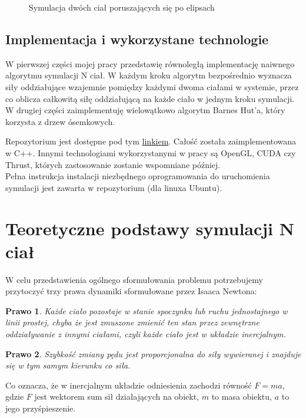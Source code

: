 \documentclass[14pt,twoside,a4paper]{article}
\newtheorem{theorem}{Prawo}
\theoremstyle{definition}
\begin{document}
\begin{figure}
    \centering
    \def\svgwidth{\columnwidth}
    
    \caption{Symulacja dwóch ciał poruszających się po elipsach}
    \label{fig:kulki}
\end{figure}


\subsection{\Large Implementacja i wykorzystane technologie}
W pierwszej części mojej pracy przedstawię równoległą implementację naiwnego algorytmu symulacji N ciał. W każdym kroku algorytm bezpośrednio wyznacza siły oddziałujące wzajemnie pomiędzy każdymi dwoma ciałami w systemie, przez co oblicza całkowitą siłę oddziałującą na każde ciało w jednym kroku symulacji. W drugiej części zaimplementuję wielowątkowo algorytm Barnes Hut'a, który korzysta z drzew ósemkowych.

Repozytorium jest dostępne pod tym \href{https://github.com/damian1996/N-Body-Simulation}{linkiem}.
Całość została zaimplementowana w C++. Innymi technologiami wykorzystanymi w pracy są OpenGL, CUDA czy Thrust, których zastosowanie zostanie wspomniane później. \\
Pełna instrukcja instalacji niezbędnego oprogramowania do uruchomienia symulacji jest zawarta w repozytorium (dla linuxa Ubuntu).

\section{\LARGE Teoretyczne podstawy symulacji N ciał}

W celu przedstawienia ogólnego sformułowania problemu potrzebujemy przytoczyć trzy prawa dynamiki sformułowane przez Isaaca Newtona: \cite[str.~3-4]{fund}

\begin{theorem}
Każde ciało pozostaje w stanie spoczynku lub ruchu jednostajnego w linii prostej, chyba że jest zmuszone zmienić ten stan przez zewnętrzne oddziaływanie z innymi ciałami, czyli każde ciało jest w układzie inercjalnym.
\end{theorem}

\begin{theorem}
Szybkość zmiany pędu jest proporcjonalna do siły wywieranej i znajduje się w tym samym kierunku co siła.
\end{theorem}
Co oznacza, że w inercjalnym układzie odniesienia zachodzi równość $F=ma$, gdzie $F$ jest wektorem sum sił działających na obiekt, $m$ to masa obiektu, $a$ to jego przyśpieszenie.
\end{document}
